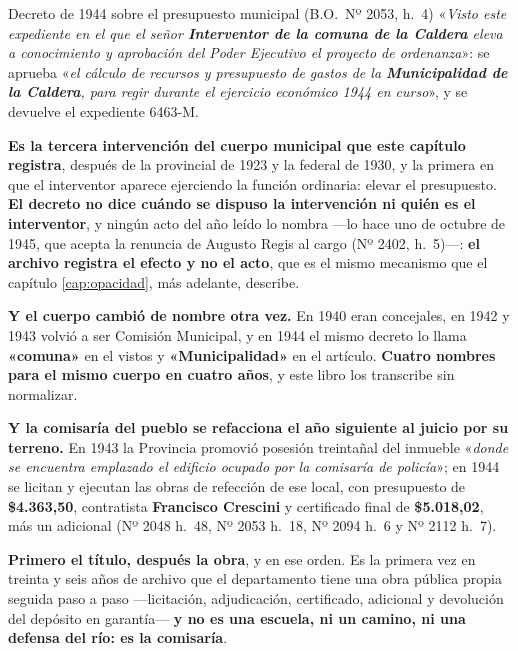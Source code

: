 \begin{ficha}{Decreto de 1944 sobre el presupuesto municipal (B.O.\ Nº 2053, h.\ 4)}
«\textit{Visto este expediente en el que el señor \textbf{Interventor de la
comuna de la Caldera} eleva a conocimiento y aprobación del Poder Ejecutivo el
proyecto de ordenanza}»: se aprueba «\textit{el cálculo de recursos y
presupuesto de gastos de la \textbf{Municipalidad de la Caldera}, para regir
durante el ejercicio económico 1944 en curso}», y se devuelve el expediente
6463-M.
\end{ficha}

\begin{cautela}
\textbf{Es la tercera intervención del cuerpo municipal que este capítulo
registra}, después de la provincial de 1923 y la federal de 1930, y la primera
en que el interventor aparece ejerciendo la función ordinaria: elevar el
presupuesto. \textbf{El decreto no dice cuándo se dispuso la intervención ni
quién es el interventor}, y ningún acto del año leído lo nombra ---lo hace uno de octubre de 1945, que acepta
la renuncia de Augusto Regis al cargo (Nº 2402, h.\ 5)---: \textbf{el
archivo registra el efecto y no el acto}, que es el mismo mecanismo que el
capítulo \ref{cap:opacidad}, más adelante, describe.

\textbf{Y el cuerpo cambió de nombre otra vez.} En 1940 eran concejales, en 1942
y 1943 volvió a ser Comisión Municipal, y en 1944 el mismo decreto lo llama
\textbf{«comuna»} en el vistos y \textbf{«Municipalidad»} en el artículo.
\textbf{Cuatro nombres para el mismo cuerpo en cuatro años}, y este libro los
transcribe sin normalizar.
\end{cautela}

\begin{cautela}
\textbf{Y la comisaría del pueblo se refacciona el año siguiente al juicio por
su terreno.} En 1943 la Provincia promovió posesión treintañal del inmueble
«\textit{donde se encuentra emplazado el edificio ocupado por la comisaría de
policía}»; en 1944 se licitan y ejecutan las obras de refección de ese local,
con presupuesto de \textbf{\$4.363,50}, contratista \textbf{Francisco Crescini} y
certificado final de \textbf{\$5.018,02}, más un adicional (Nº 2048 h.\ 48,
Nº 2053 h.\ 18, Nº 2094 h.\ 6 y Nº 2112 h.\ 7).

\textbf{Primero el título, después la obra}, y en ese orden. Es la primera vez
en treinta y seis años de archivo que el departamento tiene una obra pública
propia seguida paso a paso ---licitación, adjudicación, certificado, adicional
y devolución del depósito en garantía--- \textbf{y no es una escuela, ni un
camino, ni una defensa del río: es la comisaría}.
\end{cautela}

